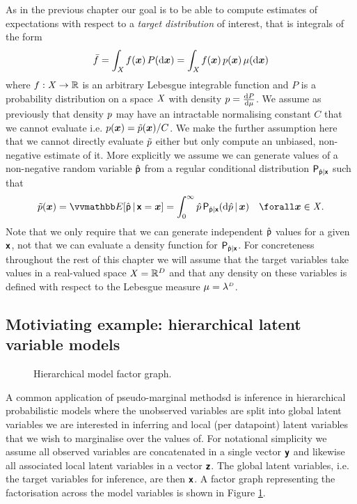 As in the previous chapter our goal is to be able to compute estimates of expectations with respect to a \emph{target distribution} of interest, that is integrals of the form
\begin{equation}
  \bar{f} = \int_{\mathit{X}} f(\boldsymbol{x})\,P(\mathrm{d} \boldsymbol{x}) = \int_{\mathit{X}} f(\boldsymbol{x})\,p(\boldsymbol{x})\,\mu(\mathrm{d}\boldsymbol{x})
\end{equation}
where $f : \mathit{X} \to \mathbb{R}$ is an arbitrary Lebesgue integrable function and $P$ is a probability distribution on a space $\mathit{X}$ with density $p = \frac{\mathrm{d} P}{\mathrm{d} \mu}$. We assume as previously that density $p$ may have an intractable normalising constant $C$ that we cannot evaluate i.e. $p(\boldsymbol{x}) = \tilde{p}(\boldsymbol{x}) / C$. We make the further assumption here that we cannot directly evaluate $\tilde{p}$ either but only compute an unbiased, non-negative estimate of it. More explicitly we assume we can generate values of a non-negative random variable $\hat{\mathsf{p}}$ from a regular conditional distribution $\mathsf{P}_{\hat{\mathsf{p}}|\boldsymbol{\mathsf{x}}}$ such that
\begin{equation}\label{eq:pm-density-unbiased-estimator}
  \utgtdens(\vct{x}) = \expc{ \hat{\rvar{p}} \gvn \rvct{x} = \vct{x}}
  = \int_{0}^{\infty} \hat{p} \, \prob{\hat{\rvar{p}}|\rvct{x}}(\dr\hat{p}\gvn\vct{x})
  \quad \forall \vct{x} \in \set{X}.
\end{equation}
Note that we only require that we can generate independent $\hat{\mathsf{p}}$ values for a given $\boldsymbol{\mathsf{x}}$, not that we can evaluate a  density function for $\mathsf{P}_{\hat{\mathsf{p}}|\boldsymbol{\mathsf{x}}}$. For concreteness throughout the rest of this chapter we will assume that the target variables take values in a real-valued space $\mathit{X} = \mathbb{R}^D$ and that any density on these variables is defined with respect to the Lebesgue measure $\mu = \lebm{D}$.

\subsection{Motiviating example: hierarchical latent variable models}

\begin{figure}[!t]
\centering
{}
\caption{Hierarchical model factor graph.}
\label{fig:global-local-latent-variable-model}
\end{figure}

A common application of pseudo-marginal methodsd is inference in hierarchical probabilistic models where the unobserved variables are split into global latent variables we are interested in inferring and local (per datapoint) latent variables that we wish to marginalise over the values of. For notational simplicity we assume all observed variables are concatenated in a single vector $\boldsymbol{\mathsf{y}}$ and likewise all associated local latent variables in a vector $\boldsymbol{\mathsf{z}}$. The global latent variables, i.e. the target variables for inference, are then $\boldsymbol{\mathsf{x}}$. A factor graph representing the factorisation across the model variables is shown in Figure \ref{fig:global-local-latent-variable-model}.

